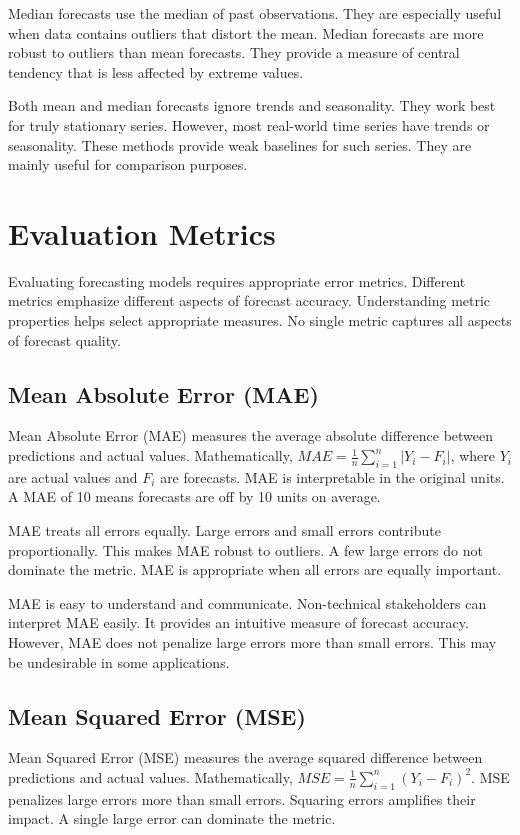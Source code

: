 Median forecasts use the median of past observations. They are especially useful when data contains outliers that distort the mean. Median forecasts are more robust to outliers than mean forecasts. They provide a measure of central tendency that is less affected by extreme values.

Both mean and median forecasts ignore trends and seasonality. They work best for truly stationary series. However, most real-world time series have trends or seasonality. These methods provide weak baselines for such series. They are mainly useful for comparison purposes.

\section{Evaluation Metrics}

Evaluating forecasting models requires appropriate error metrics. Different metrics emphasize different aspects of forecast accuracy. Understanding metric properties helps select appropriate measures. No single metric captures all aspects of forecast quality.

\subsection{Mean Absolute Error (MAE)}

Mean Absolute Error (MAE) measures the average absolute difference between predictions and actual values. Mathematically, \(MAE = \frac{1}{n}\sum_{i=1}^{n}|Y_i - F_i|\), where \(Y_i\) are actual values and \(F_i\) are forecasts. MAE is interpretable in the original units. A MAE of 10 means forecasts are off by 10 units on average.

MAE treats all errors equally. Large errors and small errors contribute proportionally. This makes MAE robust to outliers. A few large errors do not dominate the metric. MAE is appropriate when all errors are equally important.

MAE is easy to understand and communicate. Non-technical stakeholders can interpret MAE easily. It provides an intuitive measure of forecast accuracy. However, MAE does not penalize large errors more than small errors. This may be undesirable in some applications.

\subsection{Mean Squared Error (MSE)}

Mean Squared Error (MSE) measures the average squared difference between predictions and actual values. Mathematically, \(MSE = \frac{1}{n}\sum_{i=1}^{n}(Y_i - F_i)^2\). MSE penalizes large errors more than small errors. Squaring errors amplifies their impact. A single large error can dominate the metric.


